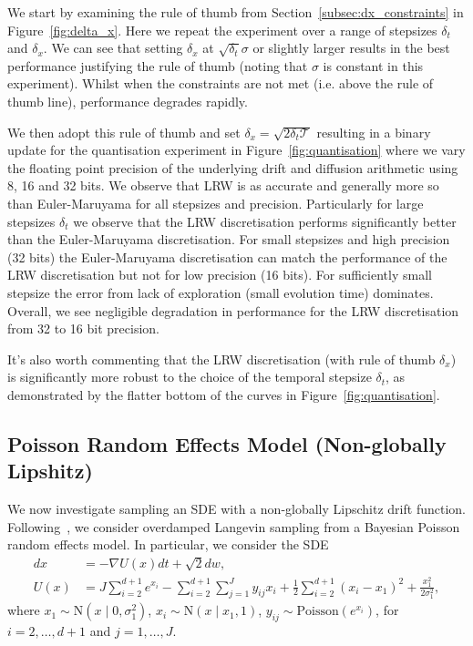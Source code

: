\documentclass[pra,showpacs,amsmath,amssymb,amsfonts,lengthcheck,longbibliography,onecolumn]{revtex4-2}
\begin{document}
We start by examining the rule of thumb from Section~\ref{subsec:dx_constraints} in Figure~\ref{fig:delta_x}.
Here we repeat the experiment over a range of stepsizes $\delta_t$ and $\delta_x$. We can see that
setting $\delta_x$ at $\sqrt{\delta_t} \sigma$ or slightly larger results in the best performance
justifying the rule of thumb (noting that $\sigma$ is constant in this experiment). Whilst when the constraints are not met (i.e. above the rule of thumb line), performance degrades rapidly.

We then adopt this rule of thumb and set $\delta_x = \sqrt{2\delta_t \mathcal{T}}$ resulting in a binary update
for the quantisation experiment in Figure~\ref{fig:quantisation} where we vary the floating point precision
of the underlying drift and diffusion arithmetic using 8, 16 and 32 bits.
We observe that LRW is as accurate and generally more so than Euler-Maruyama for all stepsizes and precision.
Particularly for large stepsizes $\delta_t$ we observe that the LRW discretisation performs significantly better than the Euler-Maruyama
discretisation. For small stepsizes and high precision (32 bits) the Euler-Maruyama discretisation
can match the performance of the LRW discretisation but not for low precision (16 bits). For sufficiently
small stepsize the error from lack of exploration (small evolution time) dominates.
Overall, we see negligible degradation in performance for the LRW discretisation
from 32 to 16 bit precision.

It's also worth commenting that the LRW discretisation (with rule of thumb $\delta_x$) is significantly more robust to the choice of the temporal stepsize $\delta_t$, as demonstrated by the flatter bottom of the curves in Figure~\ref{fig:quantisation}.

\subsection{Poisson Random Effects Model (Non-globally Lipshitz)}\label{subsec:exp_non_lipschitz}

We now investigate sampling an SDE with a non-globally Lipschitz drift function. Following~\cite{iguchi2024skew}, we consider overdamped Langevin sampling from
a Bayesian Poisson random effects model. In particular, we consider the SDE 
\begin{align*}
  dx &= - \nabla U(x) dt + \sqrt{2} dw, \\
  U(x) &= J \sum_{i=2}^{d+1} e^{x_i} - \sum_{i=2}^{d+1} \sum_{j=1}^J y_{ij} x_i
  + \frac12 \sum_{i=2}^{d+1} (x_i - x_1)^2 + \frac{x_1^2}{2\sigma_1^2},
\end{align*}
where $x_1 \sim \mathrm{N}(x \mid 0, \sigma_1^2)$, $x_i \sim \mathrm{N}(x \mid x_1, 1)$,
$y_{ij} \sim \text{Poisson}(e^{x_i})$, for $i=2,\ldots,d+1$ and $j=1,\ldots,J$.
\end{document}
